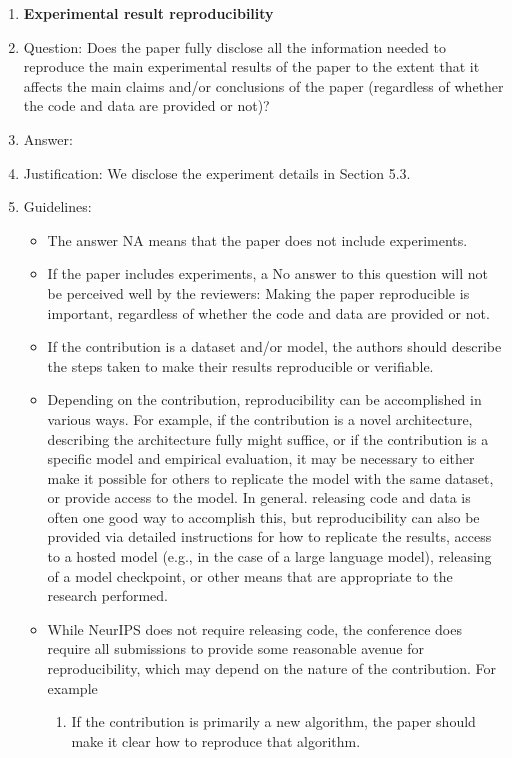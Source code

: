 \documentclass{article}
\theoremstyle{definition}
\begin{document}
\begin{enumerate}
    \item {\bf Experimental result reproducibility}
    \item[] Question: Does the paper fully disclose all the information needed to reproduce the main experimental results of the paper to the extent that it affects the main claims and/or conclusions of the paper (regardless of whether the code and data are provided or not)?
    \item[] Answer: \answerYes{} %
    \item[] Justification: We disclose the experiment details in Section 5.3.
    \item[] Guidelines:
    \begin{itemize}
        \item The answer NA means that the paper does not include experiments.
        \item If the paper includes experiments, a No answer to this question will not be perceived well by the reviewers: Making the paper reproducible is important, regardless of whether the code and data are provided or not.
        \item If the contribution is a dataset and/or model, the authors should describe the steps taken to make their results reproducible or verifiable. 
        \item Depending on the contribution, reproducibility can be accomplished in various ways. For example, if the contribution is a novel architecture, describing the architecture fully might suffice, or if the contribution is a specific model and empirical evaluation, it may be necessary to either make it possible for others to replicate the model with the same dataset, or provide access to the model. In general. releasing code and data is often one good way to accomplish this, but reproducibility can also be provided via detailed instructions for how to replicate the results, access to a hosted model (e.g., in the case of a large language model), releasing of a model checkpoint, or other means that are appropriate to the research performed.
        \item While NeurIPS does not require releasing code, the conference does require all submissions to provide some reasonable avenue for reproducibility, which may depend on the nature of the contribution. For example
        \begin{enumerate}
            \item If the contribution is primarily a new algorithm, the paper should make it clear how to reproduce that algorithm.

\end{enumerate}
\end{itemize}
\end{enumerate}
\end{document}
